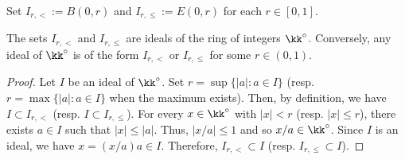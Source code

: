     Set \(I_{r,<} := B(0,r)\) and \(I_{r,\leq} := E(0,r)\) for each \(r \in [0,1]\).

    \begin{proposition}\label{prop:ideal_of_integers_ring_of_NA_field}
        The sets \(I_{r,<}\) and \(I_{r,\leq}\) are ideals of the ring of integers \(\kk^\circ\).
        Conversely, any ideal of \(\kk^\circ\) is of the form \(I_{r,<}\) or \(I_{r,\leq}\) for some \(r \in (0,1)\).
    \end{proposition}
    \begin{proof}
        Let \(I\) be an ideal of \(\kk^\circ\).
        Set \(r = \sup\{ |a| : a \in I \} \) (resp. \(r= \max\{ |a| : a \in I \} \) when the maximum exists).
        Then, by definition, we have \(I \subset I_{r,<}\) (resp. \(I \subset I_{r,\leq}\)).
        For every \(x \in \kk^\circ\) with \(|x| < r\) (resp. \(|x| \leq r\)), there exists \(a \in I\) such that \(|x| \leq |a|\).
        Thus, \(|x/a| \leq 1\) and so \(x/a \in \kk^\circ\).
        Since \(I\) is an ideal, we have \(x = (x/a) a \in I\).
        Therefore, \(I_{r,<} \subset I\) (resp. \(I_{r,\leq} \subset I\)).
    \end{proof}

